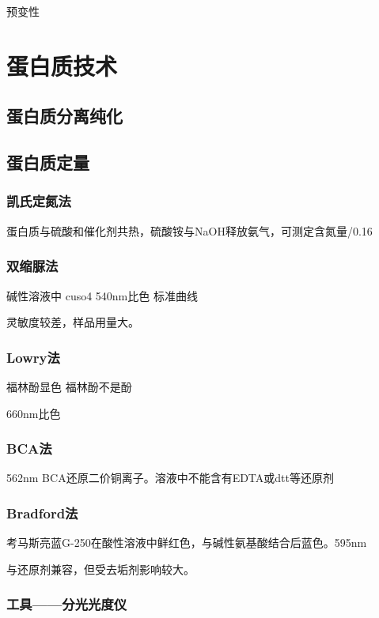 预变性




\section{蛋白质技术}

\subsection{蛋白质分离纯化}

\subsection{蛋白质定量}

\subsubsection{凯氏定氮法}

蛋白质与硫酸和催化剂共热，硫酸铵与NaOH释放氨气，可测定含氮量/0.16

\subsubsection{双缩脲法}

碱性溶液中 cuso4 540nm比色 标准曲线

灵敏度较差，样品用量大。

\subsubsection{Lowry法}

福林酚显色  福林酚不是酚

660nm比色

\subsubsection{BCA法}

562nm BCA还原二价铜离子。溶液中不能含有EDTA或dtt等还原剂

\subsubsection{Bradford法}

考马斯亮蓝G-250在酸性溶液中鲜红色，与碱性氨基酸结合后蓝色。595nm

与还原剂兼容，但受去垢剂影响较大。

\subsubsection{工具——分光光度仪}

